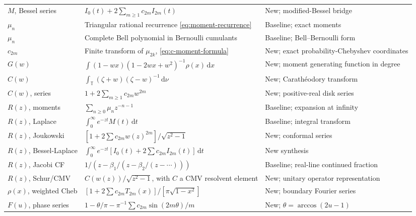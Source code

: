 \documentclass[11pt,oneside]{article}
\theoremstyle{definition}
\newcommand{\dd}{\,\mathrm d}
\newcommand{\T}{\mathbb T}
\begin{document}
\begin{longtable}{p{}p{}p{}}
\(M\), Bessel series &
\(I_0(t)+2\sum_{m\ge1}c_{2m}I_{2m}(t)\) &
New; modified-Bessel bridge\\

\(\mu_n\) &
Triangular rational recurrence \eqref{eq:moment-recurrence} &
Baseline; exact moments\\

\(\mu_n\) &
Complete Bell polynomial in Bernoulli cumulants &
Baseline; Bell--Bernoulli form\\

\(c_{2m}\) &
Finite transform of \(\mu_{2k}\), \eqref{eq:c-moment-formula} &
New; exact probability-Chebyshev coordinates\\

\(G(w)\) &
\(\int(1-wx)(1-2wx+w^2)^{-1}\rho(x)\dd x\) &
New; moment generating function in degree\\

\(C(w)\) &
\(\int_{\T}(\zeta+w)(\zeta-w)^{-1}\dd\nu\) &
New; Carath\'eodory transform\\

\(C(w)\), series &
\(1+2\sum_{m\ge1}c_{2m}w^{2m}\) &
New; positive-real disk series\\

\(R(z)\), moments &
\(\sum_{n\ge0}\mu_nz^{-n-1}\) &
Baseline; expansion at infinity\\

\(R(z)\), Laplace &
\(\int_0^\infty e^{-zt}M(t)\dd t\) &
Baseline; integral transform\\

\(R(z)\), Joukowski &
\([1+2\sum c_{2m}w(z)^{2m}]/\sqrt{z^2-1}\) &
New; conformal series\\

\(R(z)\), Bessel-Laplace &
\(\int_0^\infty e^{-zt}[I_0(t)+2\sum c_{2m}I_{2m}(t)]\dd t\) &
New synthesis\\

\(R(z)\), Jacobi CF &
\(1/(z-\beta_1/(z-\beta_2/(z-\cdots)))\) &
Baseline; real-line continued fraction\\

\(R(z)\), Schur/CMV &
\(C(w(z))/\sqrt{z^2-1}\), with \(C\) a CMV resolvent element &
New; unitary operator representation\\

\(\rho(x)\), weighted Cheb &
\([1+2\sum c_{2m}T_{2m}(x)]/[\pi\sqrt{1-x^2}]\) &
New; boundary Fourier series\\

\(F(u)\), phase series &
\(1-\theta/\pi-\pi^{-1}\sum c_{2m}\sin(2m\theta)/m\) &
New; \(\theta=\arccos(2u-1)\)\\


\end{longtable}
\end{document}
